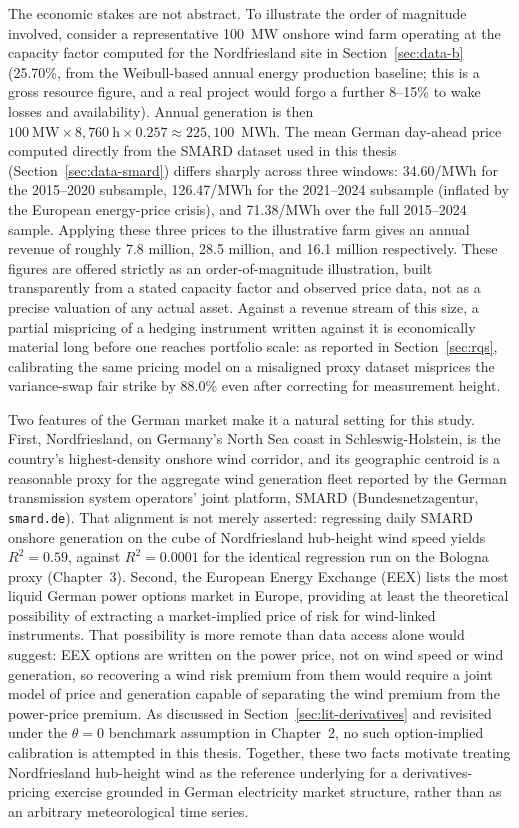 ﻿\documentclass[11pt, a4paper, twoside]{article}
\begin{document}
The economic stakes are not abstract. To illustrate the order of magnitude involved, consider a representative 100~MW onshore wind farm operating at the capacity factor computed for the Nordfriesland site in Section~\ref{sec:data-b} (25.70\%, from the Weibull-based annual energy production baseline; this is a gross resource figure, and a real project would forgo a further 8--15\% to wake losses and availability). Annual generation is then $100~\text{MW} \times 8{,}760~\text{h} \times 0.257 \approx 225{,}100$~MWh. The mean German day-ahead price computed directly from the SMARD dataset used in this thesis (Section~\ref{sec:data-smard}) differs sharply across three windows: \texteuro{}34.60/MWh for the 2015--2020 subsample, \texteuro{}126.47/MWh for the 2021--2024 subsample (inflated by the European energy-price crisis), and \texteuro{}71.38/MWh over the full 2015--2024 sample. Applying these three prices to the illustrative farm gives an annual revenue of roughly \texteuro{}7.8 million, \texteuro{}28.5 million, and \texteuro{}16.1 million respectively. These figures are offered strictly as an order-of-magnitude illustration, built transparently from a stated capacity factor and observed price data, not as a precise valuation of any actual asset. Against a revenue stream of this size, a partial mispricing of a hedging instrument written against it is economically material long before one reaches portfolio scale: as reported in Section~\ref{sec:rqs}, calibrating the same pricing model on a misaligned proxy dataset misprices the variance-swap fair strike by 88.0\% even after correcting for measurement height.

Two features of the German market make it a natural setting for this study. First, Nordfriesland, on Germany's North Sea coast in Schleswig-Holstein, is the country's highest-density onshore wind corridor, and its geographic centroid is a reasonable proxy for the aggregate wind generation fleet reported by the German transmission system operators' joint platform, SMARD (Bundesnetzagentur, \texttt{smard.de}). That alignment is not merely asserted: regressing daily SMARD onshore generation on the cube of Nordfriesland hub-height wind speed yields $R^2 = 0.59$, against $R^2 = 0.0001$ for the identical regression run on the Bologna proxy (Chapter~3). Second, the European Energy Exchange (EEX) lists the most liquid German power options market in Europe, providing at least the theoretical possibility of extracting a market-implied price of risk for wind-linked instruments. That possibility is more remote than data access alone would suggest: EEX options are written on the power price, not on wind speed or wind generation, so recovering a wind risk premium from them would require a joint model of price and generation capable of separating the wind premium from the power-price premium. As discussed in Section~\ref{sec:lit-derivatives} and revisited under the $\theta = 0$ benchmark assumption in Chapter~2, no such option-implied calibration is attempted in this thesis. Together, these two facts motivate treating Nordfriesland hub-height wind as the reference underlying for a derivatives-pricing exercise grounded in German electricity market structure, rather than as an arbitrary meteorological time series.
\end{document}
